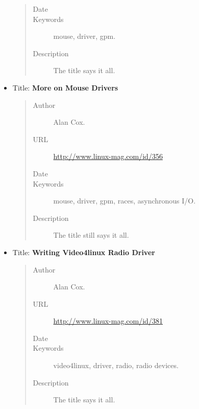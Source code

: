 \documentclass[a4paper,8pt,english]{sphinxmanual}
\begin{document}
\begin{itemize}
\begin{quote}
\begin{description}
\item[{Date}] 

\item[{Keywords}] \leavevmode
mouse, driver, gpm.

\item[{Description}] \leavevmode
The title says it all.

\end{description}\end{quote}

\item {} 
Title: \textbf{More on Mouse Drivers}
\begin{quote}\begin{description}
\item[{Author}] \leavevmode
Alan Cox.

\item[{URL}] \leavevmode
\href{http://www.linux-mag.com/id/356}{http://www.linux-mag.com/id/356}

\item[{Date}] 

\item[{Keywords}] \leavevmode
mouse, driver, gpm, races, asynchronous I/O.

\item[{Description}] \leavevmode
The title still says it all.

\end{description}\end{quote}

\item {} 
Title: \textbf{Writing Video4linux Radio Driver}
\begin{quote}\begin{description}
\item[{Author}] \leavevmode
Alan Cox.

\item[{URL}] \leavevmode
\href{http://www.linux-mag.com/id/381}{http://www.linux-mag.com/id/381}

\item[{Date}] 

\item[{Keywords}] \leavevmode
video4linux, driver, radio, radio devices.

\item[{Description}] \leavevmode
The title says it all.

\end{description}\end{quote}


\end{itemize}
\end{document}
